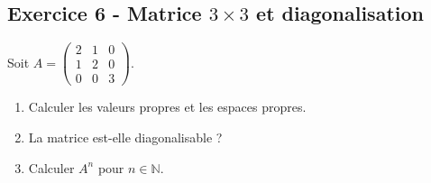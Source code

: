 \documentclass[12pt,a4paper]{article}
\begin{document}
\subsection*{Exercice 6 - Matrice $3\times3$ et diagonalisation \niveau{\moyen}}

\begin{boiteexercice}
Soit $A = \begin{pmatrix}2&1&0\\1&2&0\\0&0&3\end{pmatrix}$.
\begin{enumerate}
  \item Calculer les valeurs propres et les espaces propres.
  \item La matrice est-elle diagonalisable ?
  \item Calculer $A^n$ pour $n\in\mathbb{N}$.
\end{enumerate}
\end{boiteexercice}
\end{document}
